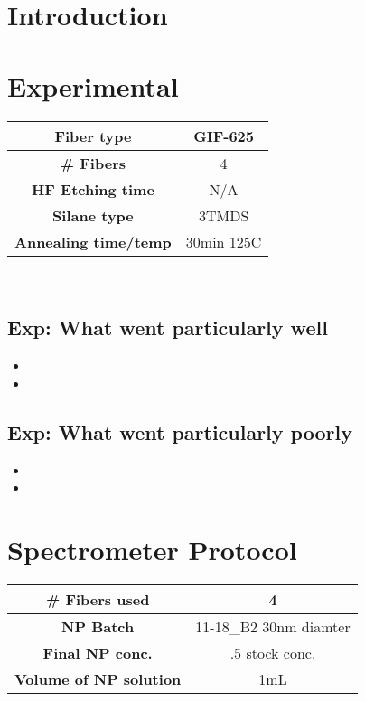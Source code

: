 \section{Introduction}

\section{Experimental}


\begin{center}
\begin{tabular}{| c | c |}
 \hline
 {\bf Fiber type} & GIF-625 \\ \hline
 {\bf \# Fibers} & 4  \\ \hline
 {\bf HF Etching time} & N/A \\ \hline
 {\bf Silane type} & 3TMDS \\ \hline
 {\bf Annealing time/temp} & 30min 125C  \\ \hline
\end{tabular}
\end{center}

\\


\subsection{Exp: {\color{blue} What went particularly well}}

\begin{itemize}
\item{}
\item{}
\end{itemize}

\subsection{Exp: {\color{red} What went particularly poorly}}

\begin{itemize}
\item{}
\item{}
\end{itemize}

\section{Spectrometer Protocol}

\begin{center}
\begin{tabular}{| c | c |}
 \hline
 {\bf \# Fibers used} & 4 \\ \hline
 {\bf NP Batch} & 11-18\_B2 30nm diamter \\ \hline
 {\bf Final NP conc.} & .5 stock conc.  \\ \hline
 {\bf Volume of NP solution} & 1mL \\ \hline
\end{tabular}
\end{center}

